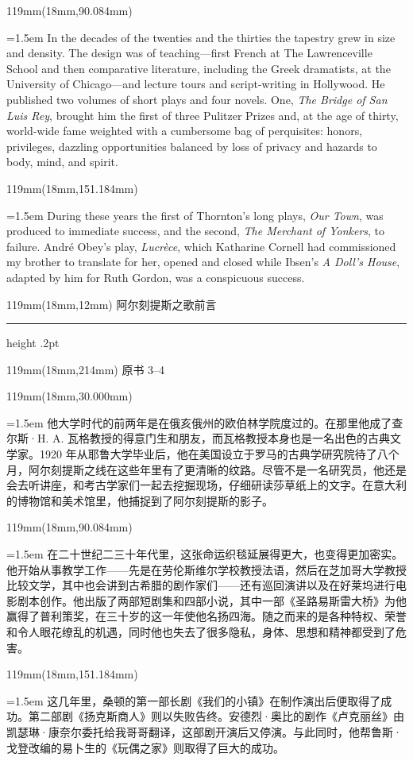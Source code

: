 \documentclass{article}
\newcommand{\ENsetup}{\normalfont\color{ink}\fontsize{11}{16.5}\selectfont\emergencystretch=1.5em}
\newcommand{\ZHsetup}{\normalfont\color{ink}\fontsize{10.5}{17}\selectfont\emergencystretch=1.5em}
\newcommand{\Block}[3]{\begin{textblock*}{119mm}(18mm,#1mm){#2 #3\par}\end{textblock*}}
\newcommand{\Heading}[3]{%
  \begin{textblock*}{119mm}(18mm,12mm)
    \color{quiet}\fontsize{7.5}{10}\selectfont
    #1\hfill #2\par\vspace{3mm}\hrule height .2pt
  \end{textblock*}
  \begin{textblock*}{119mm}(18mm,214mm)
    \color{quiet}\fontsize{7}{10}\selectfont #3\hfill\thepage
  \end{textblock*}
}
\begin{document}
\Block{90.084}{\ENsetup}{In the decades of the twenties and the thirties the tapestry grew in size and density. The design was of teaching—first French at The Lawrenceville School and then comparative literature, including the Greek dramatists, at the University of Chicago—and lecture tours and script-writing in Hollywood. He published two volumes of short plays and four novels. One, \textit{The Bridge of San Luis Rey}, brought him the first of three Pulitzer Prizes and, at the age of thirty, world-wide fame weighted with a cumbersome bag of perquisites: honors, privileges, dazzling opportunities balanced by loss of privacy and hazards to body, mind, and spirit.\par}
\Block{151.184}{\ENsetup}{During these years the first of Thornton's long plays, \textit{Our Town}, was produced to immediate success, and the second, \textit{The Merchant of Yonkers}, to failure. André Obey's play, \textit{Lucrèce}, which Katharine Cornell had commissioned my brother to translate for her, opened and closed while Ibsen's \textit{A Doll's House}, adapted by him for Ruth Gordon, was a conspicuous success.\par}
\newpage
\null
\Heading{阿尔刻提斯之歌}{前言}{原书 3–4}
\Block{30.000}{\ZHsetup}{他大学时代的前两年是在俄亥俄州的欧伯林学院度过的。在那里他成了查尔斯·H. A. 瓦格教授的得意门生和朋友，而瓦格教授本身也是一名出色的古典文学家。1920 年从耶鲁大学毕业后，他在美国设立于罗马的古典学研究院待了八个月，阿尔刻提斯之线在这些年里有了更清晰的纹路。尽管不是一名研究员，他还是会去听讲座，和考古学家们一起去挖掘现场，仔细研读莎草纸上的文字。在意大利的博物馆和美术馆里，他捕捉到了阿尔刻提斯的影子。\par }
\Block{90.084}{\ZHsetup}{在二十世纪二三十年代里，这张命运织毯延展得更大，也变得更加密实。他开始从事教学工作——先是在劳伦斯维尔学校教授法语，然后在芝加哥大学教授比较文学，其中也会讲到古希腊的剧作家们——还有巡回演讲以及在好莱坞进行电影剧本创作。他出版了两部短剧集和四部小说，其中一部《圣路易斯雷大桥》为他赢得了普利策奖，在三十岁的这一年使他名扬四海。随之而来的是各种特权、荣誉和令人眼花缭乱的机遇，同时他也失去了很多隐私，身体、思想和精神都受到了危害。\par }
\Block{151.184}{\ZHsetup}{这几年里，桑顿的第一部长剧《我们的小镇》在制作演出后便取得了成功。第二部剧《扬克斯商人》则以失败告终。安德烈·奥比的剧作《卢克丽丝》由凯瑟琳·康奈尔委托给我哥哥翻译，这部剧开演后又停演。与此同时，他帮鲁斯·戈登改编的易卜生的《玩偶之家》则取得了巨大的成功。\par }
\end{document}
